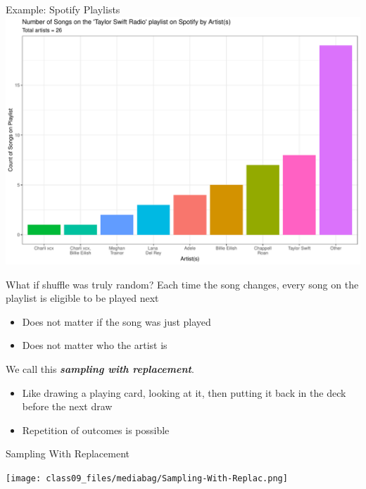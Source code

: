 \documentclass[
  ignorenonframetext,
]{beamer}
\begin{document}
\begin{frame}{Example: Spotify Playlists}
\label{example-spotify-playlists}
\includegraphics{class09_files/figure-beamer/unnamed-chunk-2-1.pdf}
\end{frame}

\begin{frame}{What if shuffle was truly random?}
\label{what-if-shuffle-was-truly-random}
Each time the song changes, every song on the playlist is eligible to be
played next

\begin{itemize}
\item
  Does not matter if the song was just played
\item
  Does not matter who the artist is
\end{itemize}

We call this \textbf{\emph{sampling with replacement}}.

\begin{itemize}
\item
  Like drawing a playing card, looking at it, then putting it back in
  the deck before the next draw
\item
  Repetition of outcomes is possible
\end{itemize}
\end{frame}

\begin{frame}{Sampling With Replacement}
\label{sampling-with-replacement}
\begin{center}
\texttt{[image: class09\_files/mediabag/Sampling-With-Replac.png]}
\end{center}
\end{frame}
\end{document}
